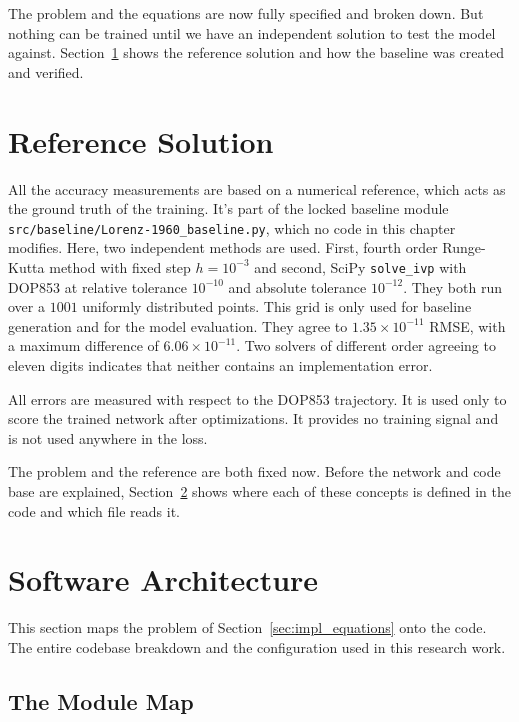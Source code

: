 The problem and the equations are now fully specified and broken down. But nothing can be trained until we have an independent solution to test the model against. Section~\ref{sec:impl_reference} shows the reference solution and how the baseline was created and verified. 

\section{Reference Solution}
\label{sec:impl_reference}

All the accuracy measurements are based on a numerical reference, which acts as the ground truth of the training. It's part of the locked baseline module \texttt{src/baseline/\allowbreak Lorenz-1960\_\allowbreak baseline.py}, which no code in this chapter modifies. Here, two independent methods are used. First, fourth order Runge-Kutta method with fixed step $h = 10^{-3}$ and second,  SciPy \texttt{solve\_ivp} with DOP853 at relative tolerance $10^{-10}$ and absolute tolerance $10^{-12}$. They both run over a  $1001$ uniformly distributed points. This grid is only used for baseline generation and for the model evaluation. They agree to $1.35 \times 10^{-11}$ RMSE, with a maximum difference of $6.06 \times 10^{-11}$. Two solvers of different order agreeing to eleven digits indicates that neither contains an implementation error.

All errors are measured with respect to the DOP853 trajectory. It is used only to score the trained network after optimizations. It provides no training signal and is not used anywhere in the loss.

The problem and the reference are both fixed now. Before the network and code base are explained, Section~\ref{sec:impl_software} shows where each of these concepts is defined in the code and which file reads it. 

\section{Software Architecture}
\label{sec:impl_software}

This section maps the problem of Section~\ref{sec:impl_equations} onto the code. The entire codebase breakdown and the configuration used in this research work. 

\subsection{The Module Map}

